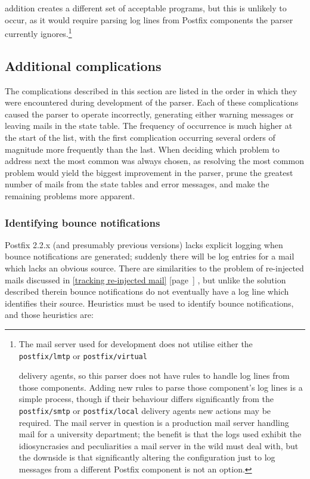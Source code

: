 \documentclass[a4paper,12pt,draft]{article}
\newcommand{\refwithpage}[1]{%
    \empty{}\ref{#1} [page~\pageref{#1}]%
}
\newcommand{\sectionref}[1]{%
    \textsection{}\refwithpage{#1}%
}
\newcommand{\daemon}[1]{%
    \texttt{postfix/#1}%
}
\begin{document}
addition creates a different set of acceptable programs, but this is
unlikely to occur, as it would require parsing log lines from Postfix
components the parser currently ignores.\footnote{The mail server used for
development does not utilise either the \daemon{lmtp} or \daemon{virtual}
delivery agents, so this parser does not have rules to handle log lines
from those components.  Adding new rules to parse those component's log
lines is a simple process, though if their behaviour differs significantly
from the \daemon{smtp} or \daemon{local} delivery agents new actions may be
required.  The mail server in question is a production mail server handling
mail for a university department; the benefit is that the logs used exhibit
the idiosyncrasies and peculiarities a mail server in the wild must deal
with, but the downside is that significantly altering the configuration
just to log messages from a different Postfix component is not an option.}


\subsection{Additional complications}

\label{additional complications}

The complications described in this section are listed in the order in
which they were encountered during development of the parser.  Each of
these complications caused the parser to operate incorrectly, generating
either warning messages or leaving mails in the state table.  The frequency
of occurrence is much higher at the start of the list, with the first
complication occurring several orders of magnitude more frequently than the
last.  When deciding which problem to address next the most common was
always chosen, as resolving the most common problem would yield the biggest
improvement in the parser, prune the greatest number of mails from
the state tables and error messages, and make the remaining problems more
apparent.


\subsubsection{Identifying bounce notifications}

\label{identifying-bounce-notifications}

Postfix 2.2.x (and presumably previous versions) lacks explicit logging
when bounce notifications are generated; suddenly there will be log entries
for a mail which lacks an obvious source.  There are similarities to the
problem of re-injected mails discussed in \sectionref{tracking re-injected
mail}, but unlike the solution described therein bounce notifications do
not eventually have a log line which identifies their source.  Heuristics
must be used to identify bounce notifications, and those heuristics are:
\end{document}
